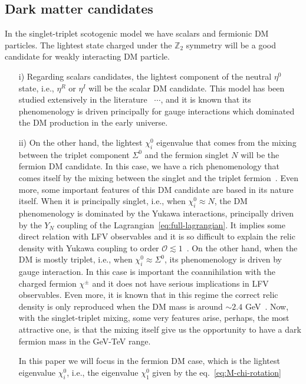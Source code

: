 \documentclass[12pt,letterpaper]{article}
\begin{document}
\subsection{Dark matter candidates}
\label{sec:dark-matter}

In the singlet-triplet scotogenic model we have scalars and fermionic DM particles. The lightest state charged under the $\mathbb{Z}_2$ symmetry will be a good candidate for weakly interacting DM particle. 
\begin{enumerate}
\item[i)] Regarding scalars candidates, the lightest component of the neutral $\eta^0$ state, i.e., $\eta^R$ or $\eta^I$ will be the scalar DM candidate. 
This model has been studied extensively in the literature~\cite{Deshpande:1977rw} $\cdots$, and it is known that its phenomenology is driven principally for gauge interactions which dominated the DM production in the early universe. 
%
\item[ii)] On the other hand, the lightest $\chi_i^0$ eigenvalue that comes from the mixing between the triplet component $\Sigma^0$ and the fermion singlet $N$ will be the fermion DM candidate. In this case, we have a rich phenomenology that comes itself by the mixing between the singlet and the triplet fermion~\cite{Hirsch:2013ola, Rocha-Moran:2016enp, Merle:2016scw}. Even more, some important features of this DM candidate are based in its nature itself. When it is principally singlet, i.e., when $\chi_i^0\approx N$, the DM phenomenology is dominated by the Yukawa interactions, principally driven by the $Y_N$ coupling of the Lagrangian~\ref{eq:full-lagrangian}. It implies some direct relation with LFV observables and it is so difficult to explain the relic density with Yukawa coupling to order $\mathcal{O}\lesssim 1$~\cite{Ibarra:2016dlb}. 
On the other hand, when the DM is mostly triplet, i.e., when $\chi_i^0\approx \Sigma^0$, its phenomenology is driven by gauge interaction. In this case is important the coannihilation with the charged fermion $\chi^{\pm}$ and it does not have serious implications in LFV observables. Even more, it is known that in this regime the correct relic density is only reproduced when the DM mass is around $\sim 2.4$ GeV~\cite{Ma:2008cu}. 
Now, with the singlet-triplet mixing, some very features arise, perhaps, the most attractive one, is that the mixing itself give us the opportunity to have a dark fermion mass in the GeV-TeV range.     

In this paper we will focus in the fermion DM case, which is the lightest eigenvalue $\chi_i^0$, i.e., the eigenvalue $\chi_1^0$ given by the eq.~\ref{eq:M-chi-rotation}
\end{enumerate}
\end{document}
